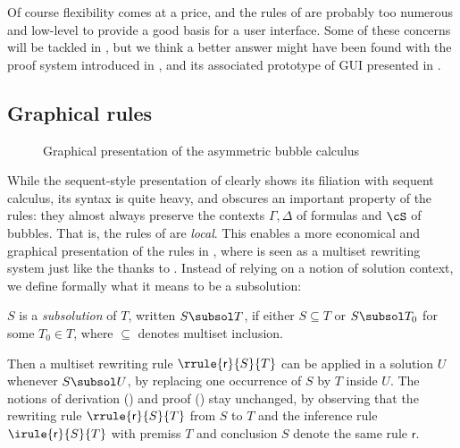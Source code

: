 Of course flexibility comes at a price, and the rules of  are probably
too numerous and low-level to provide a good basis for a user interface. Some of
these concerns will be tackled in , but we think a better
answer might have been found with the proof system introduced in
, and its associated prototype of GUI presented in
.


\subsection{Graphical rules}

\begin{figure*}
  
  \caption{Graphical presentation of the asymmetric bubble calculus }
\end{figure*}

While the sequent-style presentation of  clearly shows its filiation
with sequent calculus, its syntax is quite heavy, and obscures an important
property of the rules: they almost always preserve the contexts $\Gamma, \Delta$
of formulas and $\cS$ of bubbles. That is, the rules of  are
\emph{local}. This enables a more economical and graphical presentation of the
rules in , where  is seen as a multiset rewriting
system just like the {\cham} thanks to . Instead of relying on
a notion of solution context, we define formally what it means to be a
subsolution:

\begin{definition}[Subsolution]
  $S$ is a \emph{subsolution} of $T$, written $S \subsol T$, if either $S
  \subseteq T$ or $S \subsol T_0$ for some $T_0 \in T$, where $\subseteq$
  denotes multiset inclusion. 
\end{definition}

Then a multiset rewriting rule $\rrule{\mathsf{r}}{S}{T}$ can be applied in a
solution $U$ whenever $S \subsol U$, by replacing one occurrence of $S$ by $T$
inside $U$. The notions of derivation () and proof
() stay unchanged, by observing that the rewriting rule
$\rrule{\mathsf{r}}{S}{T}$ from $S$ to $T$ and the inference rule
$\irule{\mathsf{r}}{S}{T}$ with premiss $T$ and conclusion $S$ denote the same
rule $\mathsf{r}$.

